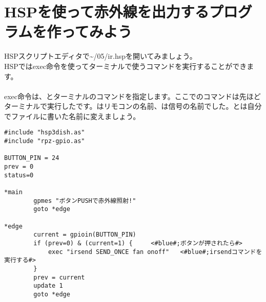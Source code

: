 \newpage
\section{HSPを使って赤外線を出力するプログラムを作ってみよう}
HSPスクリプトエディタで\textasciitilde /05/ir.hspを開いてみましょう。\\
HSPではexec命令を使ってターミナルで使うコマンドを実行することができます。\\
\\
exec命令は、とターミナルのコマンドを指定します。ここでのコマンドは先ほどターミナルで実行したです。\code{\textcolor{red}{fan}}はリモコンの名前、\code{\textcolor{red}{onoff}}は信号の名前でした。\code{\textcolor{red}{fan}}と\code{\textcolor{red}{onoff}}は自分でファイルに書いた名前に変えましょう。\\

\begin{lstlisting}[caption=ir.hsp,label=ir.hsp]
#include "hsp3dish.as"
#include "rpz-gpio.as"

BUTTON_PIN = 24
prev = 0
status=0

*main
        gpmes "ボタンPUSHで赤外線照射!"
        goto *edge

*edge
        current = gpioin(BUTTON_PIN)
        if (prev=0) & (current=1) {		<#blue#;ボタンが押されたら#>
            exec "irsend SEND_ONCE fan onoff"	<#blue#;irsendコマンドを実行する#>
        }
        prev = current
        update 1
        goto *edge
\end{lstlisting}

\begin{tcolorbox}[title=\useOmetoi]
\begin{enumerate}
\end{enumerate}
\end{tcolorbox}